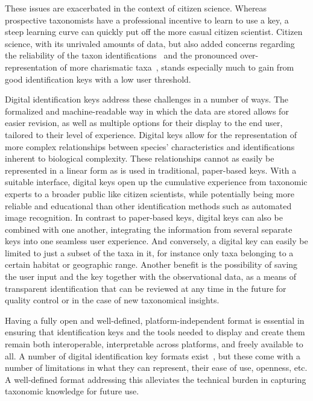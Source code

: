 \documentclass[10pt,letterpaper]{article}
\begin{document}
These issues are exacerbated in the context of citizen science. Whereas prospective taxonomists have a professional incentive to learn to use a key, a steep learning curve can quickly put off the more casual citizen scientist. Citizen science, with its unrivaled amounts of data, but also added concerns regarding the reliability of the taxon identifications~\cite{Crall2011,Burgess2017} and the pronounced over-representation of more charismatic taxa~\cite{Callaghan2020,Bayraktarov2019,Boakes2016}, stands especially much to gain from good identification keys with a low user threshold.

Digital identification keys address these challenges in a number of ways. The formalized and machine-readable way in which the data are stored allows for easier revision, as well as multiple options for their display to the end user, tailored to their level of experience. Digital keys allow for the representation of more complex relationships between species' characteristics and identifications inherent to biological complexity. These relationships cannot as easily be represented in a linear form as is used in traditional, paper-based keys. With a suitable interface, digital keys open up the cumulative experience from taxonomic experts to a broader public like citizen scientists, while potentially being more reliable and educational than other identification methods such as automated image recognition. In contrast to paper-based keys, digital keys can also be combined with one another, integrating the information from several separate keys into one seamless user experience. And conversely, a digital key can easily be limited to just a subset of the taxa in it, for instance only taxa belonging to a certain habitat or geographic range. Another benefit is the possibility of saving the user input and the key together with the observational data, as a means of transparent identification that can be reviewed at any time in the future for quality control or in the case of new taxonomical insights.

Having a fully open and well-defined, platform-independent format is essential in ensuring that identification keys and the tools needed to display and create them remain both interoperable, interpretable across platforms, and freely available to all. A number of digital identification key formats exist~\cite{Dallwitz1980, Lucid}, but these come with a number of limitations in what they can represent, their ease of use, openness, etc. A well-defined format addressing this alleviates the technical burden in capturing taxonomic knowledge for future use.
\end{document}
